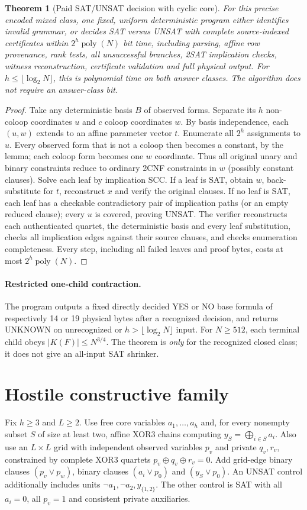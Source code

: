 \documentclass[11pt]{article}
\newtheorem{theorem}{Theorem}
\begin{document}
\begin{theorem}[Paid SAT/UNSAT decision with cyclic core]
For this precise encoded mixed class, one fixed, uniform deterministic program either identifies invalid grammar, or decides SAT versus UNSAT with complete source-indexed certificates within $2^h\operatorname{poly}(N)$ bit time, including parsing, affine row provenance, rank tests, all unsuccessful branches, 2SAT implication checks, witness reconstruction, certificate validation and full physical output. For $h\le\lfloor\log_2 N\rfloor$, this is polynomial time on both answer classes. The algorithm does not require an answer-class bit.
\end{theorem}
\begin{proof}
Take any deterministic basis $B$ of observed forms. Separate its $h$ non-coloop coordinates $u$ and $c$ coloop coordinates $w$. By basis independence, each $(u,w)$ extends to an affine parameter vector $t$. Enumerate all $2^h$ assignments to $u$. Every observed form that is not a coloop then becomes a constant, by the lemma; each coloop form becomes one $w$ coordinate. Thus all original unary and binary constraints reduce to ordinary 2CNF constraints in $w$ (possibly constant clauses). Solve each leaf by implication SCC. If a leaf is SAT, obtain $w$, back-substitute for $t$, reconstruct $x$ and verify the original clauses. If no leaf is SAT, each leaf has a checkable contradictory pair of implication paths (or an empty reduced clause); every $u$ is covered, proving UNSAT. The verifier reconstructs each authenticated quartet, the deterministic basis and every leaf substitution, checks all implication edges against their source clauses, and checks enumeration completeness. Every step, including all failed leaves and proof bytes, costs at most $2^h\operatorname{poly}(N)$.
\end{proof}

\paragraph{Restricted one-child contraction.} The program outputs a fixed directly decided YES or NO base formula of respectively 14 or 19 physical bytes after a recognized decision, and returns UNKNOWN on unrecognized or $h>\lfloor\log_2 N\rfloor$ input. For $N\ge512$, each terminal child obeys $|K(F)|\le N^{3/4}$. The theorem is \emph{only} for the recognized closed class; it does not give an all-input SAT shrinker.

\section{Hostile constructive family}
Fix $h\ge3$ and $L\ge2$. Use free core variables $a_1,\dots,a_h$ and, for every nonempty subset $S$ of size at least two, affine XOR3 chains computing $y_S=\bigoplus_{i\in S}a_i$. Also use an $L\times L$ grid with independent observed variables $p_v$ and private $q_v,r_v$, constrained by complete XOR3 quartets $p_v\oplus q_v\oplus r_v=0$. Add grid-edge binary clauses $(p_v\vee p_w)$, binary clauses $(a_i\vee p_0)$ and $(y_S\vee p_0)$. An UNSAT control additionally includes units $\neg a_1,\neg a_2,y_{\{1,2\}}$. The other control is SAT with all $a_i=0$, all $p_v=1$ and consistent private auxiliaries.
\end{document}
